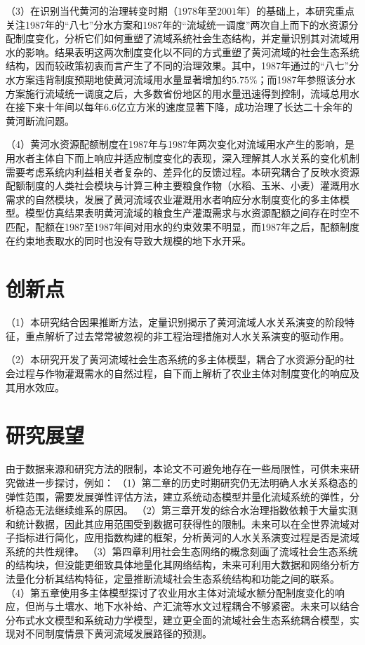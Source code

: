 （3）在识别当代黄河的治理转变时期（$1978$年至$2001$年）的基础上，本研究重点关注1987年的“八七”分水方案和1987年的“流域统一调度”两次自上而下的水资源分配制度变化，分析它们如何重塑了流域系统社会\textendash{}生态结构，并定量识别其对流域用水的影响。结果表明这两次制度变化以不同的方式重塑了黄河流域的社会\textendash{}生态系统结构，因而较政策初衷而言产生了不同的治理效果。其中，1987年通过的“八七”分水方案违背制度预期地使黄河流域用水量显著增加约$5.75\%$；而1987年参照该分水方案施行流域统一调度之后，大多数省份地区的用水量迅速得到控制，流域总用水在接下来十年间以每年$6.6$亿立方米的速度显著下降，成功治理了长达二十余年的黄河断流问题。

（4）黄河水资源配额制度在1987年与1987年两次变化对流域用水产生的影响，是用水者主体自下而上响应并适应制度变化的表现，深入理解其人\textendash{}水关系的变化机制需要考虑系统内利益相关者复杂的、差异化的反馈过程。本研究耦合了反映水资源配额制度的人类社会模块与计算三种主要粮食作物（水稻、玉米、小麦）灌溉用水需求的自然模块，发展了黄河流域农业灌溉用水者响应分水制度变化的多主体模型。模型仿真结果表明黄河流域的粮食生产灌溉需求与水资源配额之间存在时空不匹配，配额在1987至1987年间对用水的约束效果不明显，而1987年之后，配额制度在约束地表取水的同时也没有导致大规模的地下水开采。

\section{创新点}

（1）本研究结合因果推断方法，定量识别揭示了黄河流域人\textendash{}水关系演变的阶段特征，重点解析了过去常常被忽视的非工程治理措施对人\textendash{}水关系演变的驱动作用。

（2）本研究开发了黄河流域社会\textendash{}生态系统的多主体模型，耦合了水资源分配的社会过程与作物灌溉需水的自然过程，自下而上解析了农业主体对制度变化的响应及其用水效应。

\section{研究展望}

由于数据来源和研究方法的限制，本论文不可避免地存在一些局限性，可供未来研究做进一步探讨，例如：
（1）第二章的历史时期研究仍无法明确人\textendash{}水关系稳态的弹性范围，需要发展弹性评估方法，建立系统动态模型并量化流域系统的弹性，分析稳态无法继续维系的原因。
（2）第三章开发的综合水治理指数依赖于大量实测和统计数据，因此其应用范围受到数据可获得性的限制。未来可以在全世界流域对子指标进行简化，应用指数构建的框架，分析黄河的人\textendash{}水关系演变过程是否是流域系统的共性规律。
（3）第四章利用社会\textendash{}生态网络的概念刻画了流域社会\textendash{}生态系统的结构块，但没能更细致具体地量化其网络结构，未来可利用大数据和网络分析方法量化分析其结构特征，定量推断流域社会\textendash{}生态系统结构和功能之间的联系。
（4）第五章使用多主体模型探讨了农业用水主体对流域水额分配制度变化的响应，但尚与土壤水、地下水补给、产汇流等水文过程耦合不够紧密。未来可以结合分布式水文模型和系统动力学模型，建立更全面的流域社会\textendash{}生态系统耦合模型，实现对不同制度情景下黄河流域发展路径的预测。

